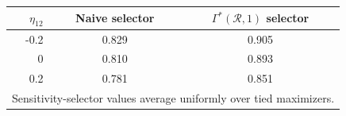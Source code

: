 \begin{tabular}{rcc}
\toprule
$\eta_{12}$ & Naive selector & $\Gamma^*(\mathcal{R},1)$ selector \\
\midrule
-0.2 & 0.829 & 0.905 \\
0 & 0.810 & 0.893 \\
0.2 & 0.781 & 0.851 \\
\midrule
\multicolumn{3}{l}{\footnotesize Sensitivity-selector values average uniformly over tied maximizers.} \\
\bottomrule
\end{tabular}
